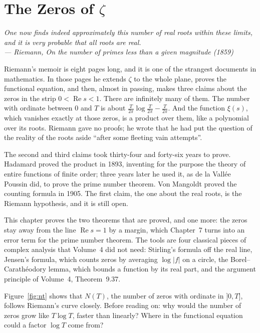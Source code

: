 \chapter{The Zeros of \texorpdfstring{$\zeta$}{zeta}}

\begin{center}\itshape
One now finds indeed approximately this number of real roots within these limits, and it is very probable that all roots are real.\\
\upshape --- Riemann, \emph{On the number of primes less than a given magnitude} (1859)
\end{center}

Riemann's memoir is eight pages long, and it is one of the strangest documents in mathematics. In those pages he extends $\zeta$ to the whole plane, proves the
functional equation, and then, almost in passing, makes three claims about the zeros in the strip $0<\operatorname{Re}s<1$. There are infinitely many of them. The number
with ordinate between $0$ and $T$ is about $\frac T{2\pi}\log\frac T{2\pi}-\frac T{2\pi}$. And the function $\xi(s)$, which vanishes exactly at those zeros, is a product over them, like a
polynomial over its roots. Riemann gave no proofs; he wrote that he had put the question of the reality of the roots aside ``after some fleeting vain attempts''.

The second and third claims took thirty-four and forty-six years to prove. Hadamard proved the product in 1893, inventing for the purpose the theory of entire functions
of finite order; three years later he used it, as de la Vallée Poussin did, to prove the prime number theorem. Von Mangoldt proved the counting formula in 1905. The
first claim, the one about the real roots, is the Riemann hypothesis, and it is still open.

This chapter proves the two theorems that are proved, and one more: the zeros stay away from the line $\operatorname{Re}s=1$ by a margin, which Chapter~7 turns into
an error term for the prime number theorem. The tools are four classical pieces of complex analysis that Volume~4 did not need: Stirling's formula off the real line,
Jensen's formula, which counts zeros by averaging $\log|f|$ on a circle, the Borel--Carathéodory lemma, which bounds a function by its real part, and the argument principle
of Volume~4, Theorem~9.37.

\begin{think}
Figure~\ref{fig:nt} shows that $N(T)$, the number of zeros with ordinate in $]0,T]$, follows Riemann's curve closely. Before reading on: why would the number of zeros
grow like $T\log T$, faster than linearly? Where in the functional equation could a factor $\log T$ come from?
\end{think}

